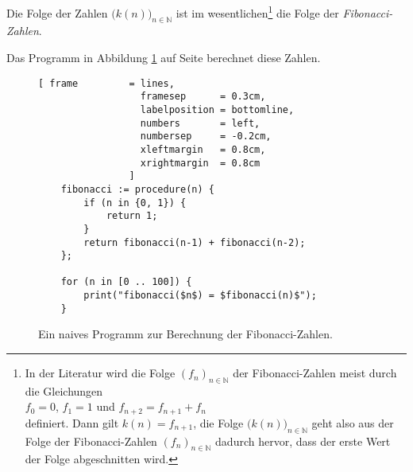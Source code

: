 Die Folge der Zahlen $\bigl(k(n)\bigr)_{n\in\mathbb{N}}$ ist im wesentlichen\footnote{
    In der Literatur wird die Folge $(f_n)_{n \in \mathbb{N}}$ der Fibonacci-Zahlen meist
    durch die Gleichungen 
    \\[0.1cm]
    \hspace*{1.3cm}
    $f_0 = 0$, \quad $f_1 = 1$ \quad und \quad $f_{n+2} = f_{n+1} + f_n$
    \\[0.1cm]
    definiert. Dann gilt $k(n) = f_{n+1}$, die Folge $\bigl(k(n)\bigr)_{n \in \mathbb{N}}$
    geht also aus der Folge der Fibonacci-Zahlen $(f_n)_{n \in \mathbb{N}}$ dadurch
    hervor, dass der erste Wert der Folge abgeschnitten wird.
}
 die Folge der
\emph{Fibonacci-Zahlen}.   

Das Programm in Abbildung
\ref{fig:fibonacci} auf Seite \pageref{fig:fibonacci} berechnet diese Zahlen.

\begin{figure}[!h]
  \centering
\begin{Verbatim}[ frame         = lines, 
                  framesep      = 0.3cm, 
                  labelposition = bottomline,
                  numbers       = left,
                  numbersep     = -0.2cm,
                  xleftmargin   = 0.8cm,
                  xrightmargin  = 0.8cm
                ]
    fibonacci := procedure(n) {
        if (n in {0, 1}) {
            return 1;
        }
        return fibonacci(n-1) + fibonacci(n-2);
    };
    
    for (n in [0 .. 100]) {
        print("fibonacci($n$) = $fibonacci(n)$");
    }
\end{Verbatim}
\vspace*{-0.3cm}
  \caption{Ein naives Programm zur Berechnung der Fibonacci-Zahlen.}
  \label{fig:fibonacci}
\end{figure} 

